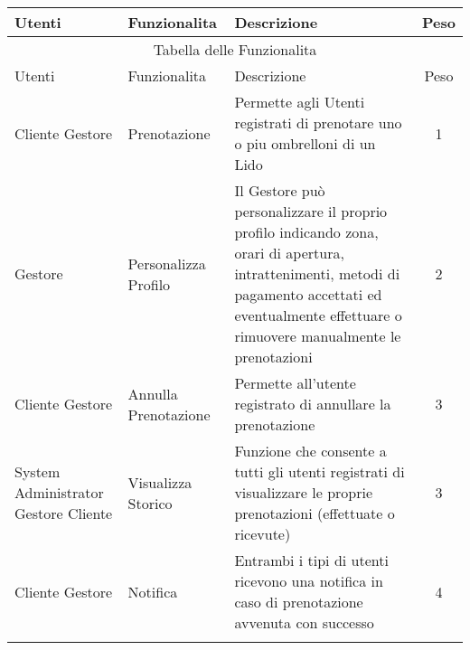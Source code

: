
\makegapedcells\keepXColumns

\begin{tabularx}{\textwidth}{|X|X|X|c|}
  \hline
   Utenti & Funzionalita & Descrizione & Peso\\
  \hline
  \endhead
 \multicolumn{4}{c}{Tabella delle Funzionalita}\\
 \hline
 Utenti & Funzionalita & Descrizione & Peso\\
 \hline
 Cliente \newline Gestore & Prenotazione & Permette agli Utenti registrati di prenotare uno o piu ombrelloni di un Lido
 & 1\\
 \hline
 Gestore & Personalizza \newline Profilo & Il Gestore può personalizzare il proprio profilo indicando zona, orari di
 apertura, intrattenimenti, metodi di pagamento accettati ed eventualmente effettuare o rimuovere manualmente le
 prenotazioni & 2\\
 \hline
 Cliente \newline Gestore & Annulla \newline Prenotazione & Permette all'utente registrato di annullare la prenotazione
 & 3\\
 \hline
 System \newline Administrator \newline Gestore \newline Cliente & Visualizza \newline Storico & Funzione che consente a
 tutti gli utenti registrati di visualizzare le proprie prenotazioni (effettuate o ricevute) & 3\\
 \hline
  Cliente \newline Gestore & Notifica & Entrambi i tipi di utenti ricevono una notifica in caso di prenotazione avvenuta
 con successo & 4\\
 \hline

\endfirsthead
\endfoot
\endlastfoot

\hline\pagebreak


\end{tabularx}
